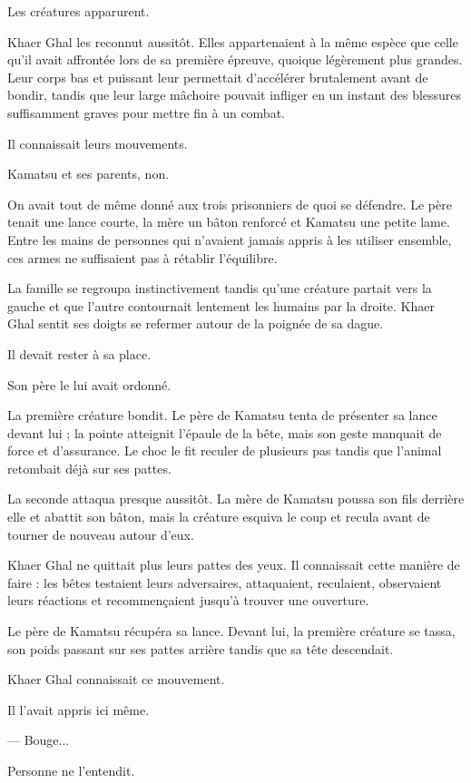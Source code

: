 Les créatures apparurent.

Khaer Ghal les reconnut aussitôt. Elles appartenaient à la même espèce que
celle qu'il avait affrontée lors de sa première épreuve, quoique légèrement
plus grandes. Leur corps bas et puissant leur permettait d'accélérer
brutalement avant de bondir, tandis que leur large mâchoire pouvait infliger en
un instant des blessures suffisamment graves pour mettre fin à un combat.

Il connaissait leurs mouvements.

Kamatsu et ses parents, non.

On avait tout de même donné aux trois prisonniers de quoi se défendre. Le père
tenait une lance courte, la mère un bâton renforcé et Kamatsu une petite lame.
Entre les mains de personnes qui n'avaient jamais appris à les utiliser
ensemble, ces armes ne suffisaient pas à rétablir l'équilibre.

La famille se regroupa instinctivement tandis qu'une créature partait vers la
gauche et que l'autre contournait lentement les humains par la droite. Khaer
Ghal sentit ses doigts se refermer autour de la poignée de sa dague.

Il devait rester à sa place.

Son père le lui avait ordonné.

La première créature bondit. Le père de Kamatsu tenta de présenter sa lance
devant lui ; la pointe atteignit l'épaule de la bête, mais son geste manquait
de force et d'assurance. Le choc le fit reculer de plusieurs pas tandis que
l'animal retombait déjà sur ses pattes.

La seconde attaqua presque aussitôt. La mère de Kamatsu poussa son fils
derrière elle et abattit son bâton, mais la créature esquiva le coup et recula
avant de tourner de nouveau autour d'eux.

Khaer Ghal ne quittait plus leurs pattes des yeux. Il connaissait cette manière
de faire : les bêtes testaient leurs adversaires, attaquaient, reculaient,
observaient leurs réactions et recommençaient jusqu'à trouver une ouverture.

Le père de Kamatsu récupéra sa lance. Devant lui, la première créature se
tassa, son poids passant sur ses pattes arrière tandis que sa tête descendait.

Khaer Ghal connaissait ce mouvement.

Il l'avait appris ici même.

— Bouge...

Personne ne l'entendit.

